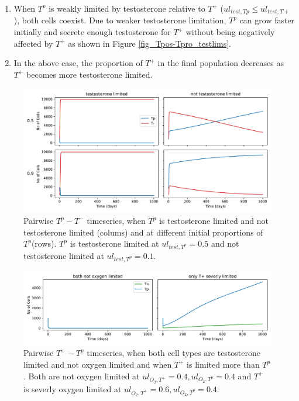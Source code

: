 \documentclass[a4paper]{article}
\begin{document}
\begin{itemize}
\begin{enumerate}
    \item When $T^p$ is weakly limited by testosterone relative to $T^+$ ($ul_{test,Tp} \leq ul_{test,T+}$), both cells coexist. Due to weaker testosterone limitation, $T^p$ can grow faster initially and secrete enough testosterone for $T^+$ without being negatively affected by $T^+$ as shown in Figure \ref{fig_Tpos-Tpro_testlims}.
    \item In the above case, the proportion of $T^+$ in the final population decreases as $T^+$ becomes more testosterone limited.
  \end{enumerate}
\end{itemize}
\begin{figure}[h]
  \centering
  \includegraphics[width=\textwidth]{Tpro-Tneg}
  \caption{Pairwise $T^p - T^-$ timeseries, when $T^p$ is testosterone limited and not testosterone limited (colums) and at different initial proportions of $T^p$(rows). $T^p$ is testosterone limited at $ul_{test,T^p}=0.5$ and not testosterone limited at $ul_{test,T^p}=0.1$.}
  \label{fig_Tpro-Tneg}
\end{figure}
\begin{figure}[h!]
  \centering
  \includegraphics[width=\textwidth]{Tpos-Tpro_o2lims}
  \caption{Pairwise $T^+ - T^p$ timeseries, when both cell types are testosterone limited and not oxygen limited and when $T^+$ is limited more than $T^p$. Both are not oxygen limited at $ul_{O_2,T^+}=0.4,ul_{O_2,T^p}=0.4$ and $T^+$ is severly oxygen limited at $ul_{O_2,T^+}=0.6,ul_{O_2,T^p}=0.4$.}
  \label{fig_Tpos-Tpro_o2lims}
\end{figure}
\end{document}
